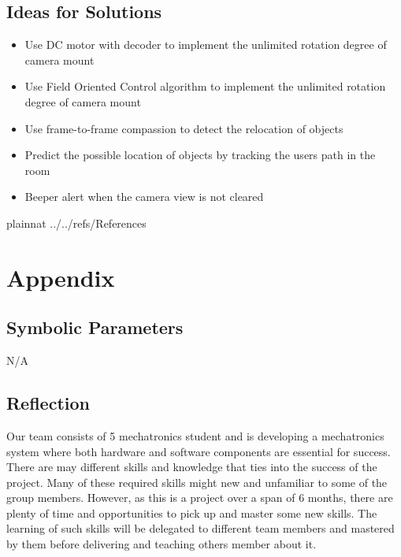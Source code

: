 \documentclass[12pt]{article}
\begin{document}
\subsection{Ideas for Solutions}
\begin{itemize}
    \item Use DC motor with decoder to implement the unlimited rotation degree of camera mount
    \item Use Field Oriented Control algorithm to implement the unlimited rotation degree of camera mount
    \item Use frame-to-frame compassion to detect the relocation of objects
    \item Predict the possible location of objects by tracking the users path in the room
    \item Beeper alert when the camera view is not cleared
\end{itemize}




\newpage

 {plainnat}
 {../../refs/References}

\newpage

\section{Appendix}


\subsection{Symbolic Parameters}

N/A

\subsection{Reflection}

Our team consists of 5 mechatronics student and is developing a mechatronics system where both hardware and software components are essential for success. There are may different skills and knowledge that ties into the success of the project. Many of these required skills might new and unfamiliar to some of the group members. However, as this is a project over a span of 6 months, there are plenty of time and opportunities to pick up and master some new skills. The learning of such skills will be delegated to different team members and mastered by them before delivering and teaching others member about it.  
\end{document}
